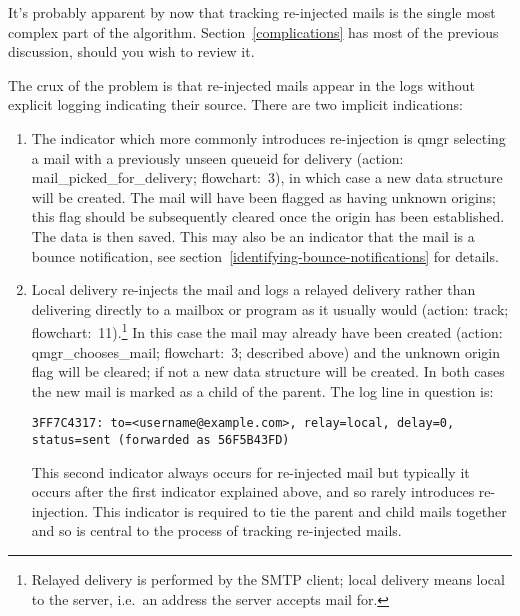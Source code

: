 \documentclass[a4paper,12pt,draft]{article}
\begin{document}
\label{tracking-re-injected-mail}

It's probably apparent by now that tracking re-injected mails is the single
most complex part of the algorithm.  Section~\ref{complications} has most
of the previous discussion, should you wish to review it.  

The crux of the problem is that re-injected mails appear in the logs
without explicit logging indicating their source.  There are two implicit
indications:

\begin{enumerate}

    \item The indicator which more commonly introduces re-injection is qmgr
        selecting a mail with a previously unseen queueid for delivery
        (action: mail\_picked\_for\_delivery; flowchart:~3), in which case
        a new data structure will be created.  The mail will have been
        flagged as having unknown origins; this flag should be subsequently
        cleared once the origin has been established.  The data is then
        saved.  This may also be an indicator that the mail is a bounce
        notification, see section~\ref{identifying-bounce-notifications}
        for details.

    \item Local delivery re-injects the mail and logs a relayed delivery
        rather than delivering directly to a mailbox or program as it
        usually would (action: track; flowchart:~11).\footnote{Relayed
        delivery is performed by the SMTP client; local delivery means
        local to the server, i.e.\ an address the server accepts mail for.}
        In this case the mail may already have been created (action:
        qmgr\_chooses\_mail; flowchart:~3; described above) and the unknown
        origin flag will be cleared; if not a new data structure will be
        created.  In both cases the new mail is marked as a child of the
        parent.  The log line in question is:

        \texttt{3FF7C4317: to=<username@example.com>, relay=local, \newline 
        delay=0, status=sent (forwarded as 56F5B43FD)}

        This second indicator always occurs for re-injected mail but
        typically it occurs after the first indicator explained above, and
        so rarely introduces re-injection.  This indicator is required to
        tie the parent and child mails together and so is central to the
        process of tracking re-injected mails.

\end{enumerate}
\end{document}

